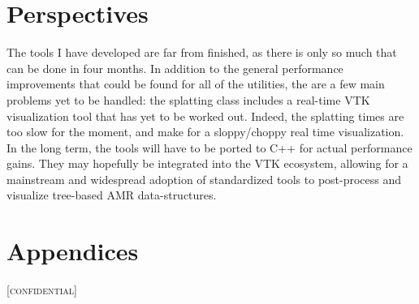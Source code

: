 \documentclass[
	a4paper,
	12pt,
	raggedright,
	twoside
]{tufte-style-article}
\theoremstyle{definition}
\theoremstyle{remark}
\begin{document}
\section{Perspectives}
The tools I have developed are far from finished, as there is only so much that can be done in four months. In addition to the general performance improvements that could be found for all of the utilities, the are a few main problems yet to be handled: the splatting class includes a real-time \Gls{VTK} visualization tool that has yet to be worked out. Indeed, the splatting times are too slow for the moment, and make for a sloppy/choppy real time visualization. In the long term, the tools will have to be ported to C++ for actual performance gains. They may hopefully be integrated into the \Gls{VTK} ecosystem, allowing for a mainstream and widespread adoption of standardized tools to post-process and visualize tree-based \Gls{AMR} data-structures.
\clearpage
\clearpage

\printglossary
\clearpage

\section{Appendices}
[\textsc{confidential}]
\end{document}
